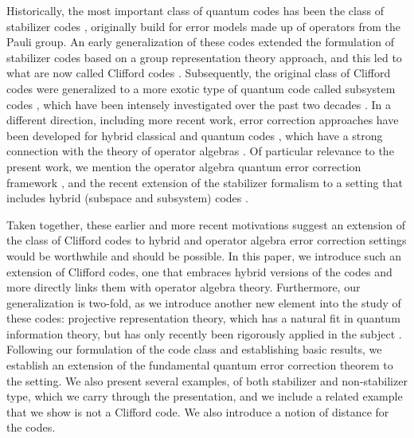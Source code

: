 \documentclass[11pt]{article}
\theoremstyle{definition}
\begin{document}
Historically, the most important class of quantum codes has been the class of stabilizer codes \cite{gottesman1996class,gottesman1997stabilizer}, originally build for error models made up of operators from the Pauli group. An early generalization of these codes extended the formulation of stabilizer codes based on a group representation theory approach, and this led to what are now called Clifford codes \cite{KnillI96,KnillII96,KlappeneckerRotteler02,KlappeneckerRottelerII02}. Subsequently, the original class of Clifford codes were generalized to a more exotic type of quantum code called subsystem codes \cite{klappenecker2008clifford,klappenecker2010clifford}, which have been intensely investigated over the past two decades \cite{bacon2006operator,Poulin2005Stabilizer,Kribs2005Unified}. 
In a different direction, including more recent work, error correction approaches have been developed for hybrid classical and quantum codes \cite{devetak2005capacity,hsieh2010entanglement,hsieh2010trading,grassl2017codes,li2020error,cao2021higher,nemec2021infinite,nemec2022encoding,majidy2018unification}, which have a strong connection with the theory of operator algebras \cite{kuperberg2003capacity,beny2009quantum,crann2016private}. Of particular relevance to the present work, we mention the operator algebra quantum error correction framework \cite{Beny2007Generalization,Beny2007Quantum}, and the recent extension of the stabilizer formalism to a setting that includes hybrid (subspace and subsystem) codes \cite{DauphinaiKribsVasmer2024,NadkarniAdonsouDauphinaisKribsVasmer2024}. 

Taken together, these earlier and more recent motivations suggest an extension of the class of Clifford codes to hybrid and operator algebra error correction settings would be worthwhile and should be possible. In this paper, we introduce such an extension of Clifford codes, one that embraces hybrid versions of the codes and more directly links them with operator algebra theory. Furthermore, our generalization is two-fold, as we introduce another new element into the study of these codes: projective representation theory, which has a natural fit in quantum information theory, but has only recently been rigorously applied in the subject \cite{Eidesen2025}. 
Following our formulation of the code class and establishing basic results, we establish an extension of the fundamental quantum error correction theorem to the setting. 
We also present several examples, of both stabilizer and non-stabilizer type, which we carry through the presentation, and we include a related example that we show is not a Clifford code. We also introduce a notion of distance for the codes.   
\end{document}
